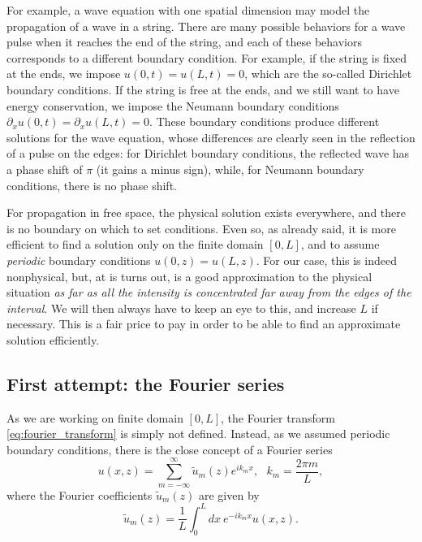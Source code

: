 \documentclass[a4paper,10pt]{report}
\begin{document}
For example, a wave equation with one spatial dimension may model the propagation of a wave in a string. There are many possible behaviors for a wave pulse when it reaches the end of the string, and each of these behaviors corresponds to a different boundary condition. For example, if the string is fixed at the ends, we impose $u(0,t) = u(L,t) = 0$, which are the so-called Dirichlet boundary conditions. If the string is free at the ends, and we still want to have energy conservation, we impose the Neumann boundary conditions $\partial_x u(0,t) = \partial_x u(L,t) = 0$. These boundary conditions produce different solutions for the wave equation, whose differences are clearly seen in the reflection of a pulse on the edges: for Dirichlet boundary conditions, the reflected wave has a phase shift of $\pi$ (it gains a minus sign), while, for Neumann boundary conditions, there is no phase shift.

For propagation in free space, the physical solution exists everywhere, and there is no boundary on which to set conditions. Even so, as already said, it is more efficient to find a solution only on the finite domain $[0,L]$, and to assume \textit{periodic} boundary conditions $u(0,z) = u(L,z)$. For our case, this is indeed nonphysical, but, at is turns out, is a good approximation to the physical situation \textit{as far as all the intensity is concentrated far away from the edges of the interval}. We will then always have to keep an eye to this, and increase $L$ if necessary. This is a fair price to pay in order to be able to find an approximate solution efficiently.

\subsection{First attempt: the Fourier series}

As we are working on finite domain $[0,L]$, the Fourier transform \eqref{eq:fourier_transform} is simply not defined. Instead, as we assumed periodic boundary conditions, there is the close concept of a Fourier series
\begin{equation}
    \label{eq:fourier series}
    u(x,z) = \sum_{m=-\infty}^{\infty} \tilde{u}_m(z) e^{i k_m x}, \ \ \ k_m = \frac{2\pi m}{L},
\end{equation}
where the Fourier coefficients $\tilde{u}_m(z)$ are given by
\begin{equation}
    \tilde{u}_m(z) = \frac{1}{L} \int_0^L dx \ e^{-i k_m x} u(x,z).
\end{equation}
\end{document}
